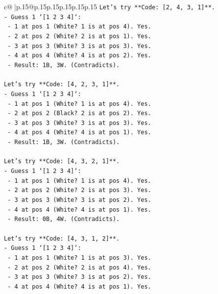 \documentclass{article}
\begin{document}
{\begin{supertabular}{c@{$\;$}|p{.15\linewidth}@{}p{.15\linewidth}p{.15\linewidth}p{.15\linewidth}p{.15\linewidth}p{.15\linewidth}}
{{{\texttt{Let's try **Code: {[}2, 4, 3, 1{]}**.} \\
\texttt{{-} Guess 1 `{[}1 2 3 4{]}`:} \\
\texttt{  {-} 1 at pos 1 (White? 1 is at pos 4). Yes.} \\
\texttt{  {-} 2 at pos 2 (White? 2 is at pos 1). Yes.} \\
\texttt{  {-} 3 at pos 3 (White? 3 is at pos 3). Yes.} \\
\texttt{  {-} 4 at pos 4 (White? 4 is at pos 2). Yes.} \\
\texttt{  {-} Result: 1B, 3W. (Contradicts).} \\
\\ 
\texttt{Let's try **Code: {[}4, 2, 3, 1{]}**.} \\
\texttt{{-} Guess 1 `{[}1 2 3 4{]}`:} \\
\texttt{  {-} 1 at pos 1 (White? 1 is at pos 4). Yes.} \\
\texttt{  {-} 2 at pos 2 (Black? 2 is at pos 2). Yes.} \\
\texttt{  {-} 3 at pos 3 (White? 3 is at pos 3). Yes.} \\
\texttt{  {-} 4 at pos 4 (White? 4 is at pos 1). Yes.} \\
\texttt{  {-} Result: 1B, 3W. (Contradicts).} \\
\\ 
\texttt{Let's try **Code: {[}4, 3, 2, 1{]}**.} \\
\texttt{{-} Guess 1 `{[}1 2 3 4{]}`:} \\
\texttt{  {-} 1 at pos 1 (White? 1 is at pos 4). Yes.} \\
\texttt{  {-} 2 at pos 2 (White? 2 is at pos 3). Yes.} \\
\texttt{  {-} 3 at pos 3 (White? 3 is at pos 2). Yes.} \\
\texttt{  {-} 4 at pos 4 (White? 4 is at pos 1). Yes.} \\
\texttt{  {-} Result: 0B, 4W. (Contradicts).} \\
\\ 
\texttt{Let's try **Code: {[}4, 3, 1, 2{]}**.} \\
\texttt{{-} Guess 1 `{[}1 2 3 4{]}`:} \\
\texttt{  {-} 1 at pos 1 (White? 1 is at pos 3). Yes.} \\
\texttt{  {-} 2 at pos 2 (White? 2 is at pos 4). Yes.} \\
\texttt{  {-} 3 at pos 3 (White? 3 is at pos 2). Yes.} \\
\texttt{  {-} 4 at pos 4 (White? 4 is at pos 1). Yes.} \\
}}}
\end{supertabular}}
\end{document}
